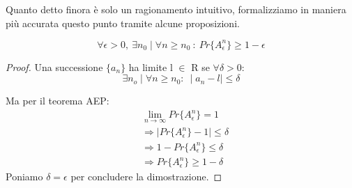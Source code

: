 \bigskip
Quanto detto finora è solo un ragionamento intuitivo, formalizziamo in maniera più accurata questo punto tramite alcune 
proposizioni.

\begin{osservazione}
 \[
   \forall \epsilon > 0, \ \exists n_0 \mid \forall n \ge n_0 \ : \ Pr\{A_{\epsilon}^n\} \ge 1 - \epsilon 
 \]
  
  \begin{proof}
   Una successione $\{a_n\}$ ha limite l $\in$ R se $\forall \delta > 0$: 
   \[
    \exists n_o \mid \forall n \ge n_0 : \ \mid a_n-l \mid \le \delta
   \]

   Ma per il teorema AEP:
   \[ \begin{split}
    & \lim_{n \to \infty} Pr\{A_{\epsilon}^n\}=1 \\
    & \Rightarrow \mid Pr\{A_{\epsilon}^n\} -1 \mid \le \delta \\
    & \Rightarrow 1- Pr\{A_{\epsilon}^n\} \le \delta \\
    & \Rightarrow Pr\{A_{\epsilon}^n\} \ge 1- \delta
    \end{split}
   \]
   Poniamo $\delta=\epsilon$ per concludere la dimostrazione.
  \end{proof}
\label{ossAep}
\end{osservazione}

